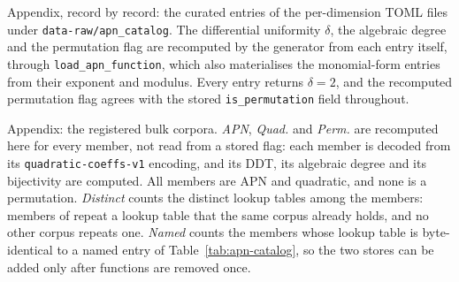 
\begin{table}[tp]
  \centering
  \scriptsize
  \setlength{\tabcolsep}{4pt}
  \caption{Appendix, record by record: the \apnCurated{} curated entries of the
    \apnCuratedFiles{} per-dimension TOML files under
    \texttt{data-raw/apn\_catalog}.  The differential uniformity $\delta$, the
    algebraic degree and the permutation flag are recomputed by the generator
    from each entry itself, through \texttt{load\_apn\_function}, which also
    materialises the monomial-form entries from their exponent and modulus.
    Every entry returns $\delta=2$, and the recomputed permutation flag agrees
    with the stored \texttt{is\_permutation} field throughout.}
  \label{tab:apn-appendix-entries}
  
\end{table}

\begin{table}[tp]
  \centering
  \scriptsize
  \setlength{\tabcolsep}{5pt}
  \caption{Appendix: the registered bulk corpora.  \emph{APN}, \emph{Quad.}
    and \emph{Perm.} are recomputed here for every member, not read from a
    stored flag: each member is decoded from its \texttt{quadratic-coeffs-v1}
    encoding, and its DDT, its algebraic degree and its bijectivity are
    computed.  All \apnInstances{} members are APN and quadratic, and none is a
    permutation.  \emph{Distinct} counts the distinct lookup tables among the
    members: \apnCorpusDupes{} members of \texttt{\apnDupCorpus} repeat a
    lookup table that the same corpus already holds, and no other corpus repeats
    one.  \emph{Named} counts the members whose lookup table is byte-identical
    to a named entry of Table~\ref{tab:apn-catalog}, so the two stores can be
    added only after \apnStoreOverlap{} functions are removed once.}
  \label{tab:apn-appendix-corpora}
  
\end{table}
